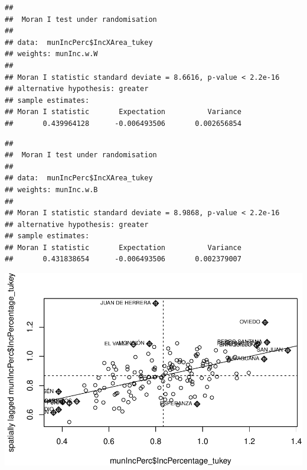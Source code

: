\documentclass[11pt,]{article}
\newenvironment{Shaded}{\begin{snugshade}}{\end{snugshade}}
\newcommand{\KeywordTok}[1]{\textcolor[rgb]{0.13,0.29,0.53}{\textbf{#1}}}
\newcommand{\DataTypeTok}[1]{\textcolor[rgb]{0.13,0.29,0.53}{#1}}
\newcommand{\StringTok}[1]{\textcolor[rgb]{0.31,0.60,0.02}{#1}}
\newcommand{\OperatorTok}[1]{\textcolor[rgb]{0.81,0.36,0.00}{\textbf{#1}}}
\newcommand{\NormalTok}[1]{#1}
\begin{document}
\begin{verbatim}
## 
##  Moran I test under randomisation
## 
## data:  munIncPerc$IncXArea_tukey  
## weights: munInc.w.W    
## 
## Moran I statistic standard deviate = 8.6616, p-value < 2.2e-16
## alternative hypothesis: greater
## sample estimates:
## Moran I statistic       Expectation          Variance 
##       0.439964128      -0.006493506       0.002656854
\end{verbatim}

\begin{Shaded}
\end{Shaded}

\begin{verbatim}
## 
##  Moran I test under randomisation
## 
## data:  munIncPerc$IncXArea_tukey  
## weights: munInc.w.B    
## 
## Moran I statistic standard deviate = 8.9868, p-value < 2.2e-16
## alternative hypothesis: greater
## sample estimates:
## Moran I statistic       Expectation          Variance 
##       0.431838654      -0.006493506       0.002379007
\end{verbatim}

\begin{Shaded}
\end{Shaded}

\includegraphics{proyecto_files/figure-latex/unnamed-chunk-28-1.pdf}
\end{document}
